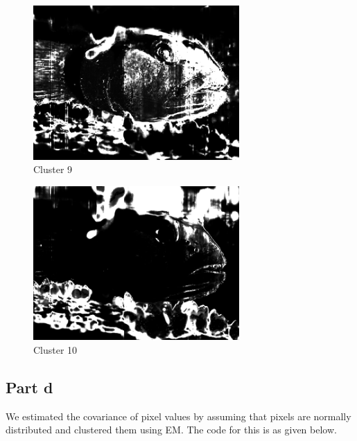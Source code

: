 \documentclass{article}      %
\begin{document}
\begin{figure}[H]
\centering
\includegraphics[width=0.7\textwidth]{partc_wts_cluster8}
\caption{Cluster 9}
\end{figure}

\begin{figure}[H]
\centering
\includegraphics[width=0.7\textwidth]{partc_wts_cluster9}
\caption{Cluster 10}
\end{figure}

\subsection{Part d}

We estimated the covariance of pixel values by assuming that pixels are normally distributed and clustered them using EM. The code for this is as given below.
\end{document}
